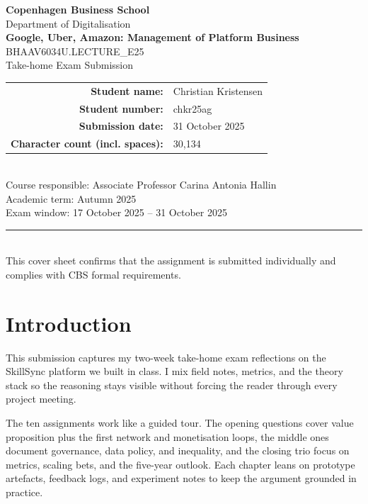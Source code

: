 \documentclass[12pt,a4paper]{article}
\newcommand{\university}{Copenhagen Business School}
\newcommand{\faculty}{Department of Digitalisation}
\newcommand{\examTitle}{Google, Uber, Amazon: Management of Platform Business}
\newcommand{\examCode}{BHAAV6034U.LECTURE\_E25}
\newcommand{\examType}{Take-home Exam Submission}
\newcommand{\studentName}{Christian Kristensen}
\newcommand{\studentId}{chkr25ag}
\newcommand{\submissionDate}{31 October 2025}
\newcommand{\wordCount}{30,134}
\begin{document}
\begin{titlepage}
  \thispagestyle{empty}
  \centering
  {\Large \textbf{\university}}\\[0.5cm]
  {\large \faculty}\\[1.5cm]
  {\LARGE \textbf{\examTitle}}\\[0.5cm]
  {\large \examCode\\\examType}\\[1.5cm]
  \begin{tabular}{rl}
    \textbf{Student name:} & \studentName \\
    \textbf{Student number:} & \studentId \\
    \textbf{Submission date:} & \submissionDate \\
    \textbf{Character count (incl. spaces):} & \wordCount \\
  \end{tabular}\\[1.5cm]
  \vfill
  {\large Course responsible: Associate Professor Carina Antonia Hallin}\\[0.3cm]
  {\large Academic term: Autumn 2025}\\[0.3cm]
  {\large Exam window: 17 October 2025 -- 31 October 2025}\\[1.5cm]
  \rule{0.8\linewidth}{0.4pt}\\[0.5cm]
  {\small This cover sheet confirms that the assignment is submitted individually and complies with CBS formal requirements.}
\end{titlepage}

\setcounter{secnumdepth}{-1}
\makeatletter
\renewcommand{\numberline}[1]{}
\makeatother

\tableofcontents
\newpage

\section*{Introduction}
This submission captures my two-week take-home exam reflections on the SkillSync platform we built in class. I mix field notes, metrics, and the theory stack so the reasoning stays visible without forcing the reader through every project meeting.

The ten assignments work like a guided tour. The opening questions cover value proposition plus the first network and monetisation loops, the middle ones document governance, data policy, and inequality, and the closing trio focus on metrics, scaling bets, and the five-year outlook. Each chapter leans on prototype artefacts, feedback logs, and experiment notes to keep the argument grounded in practice.
\end{document}
